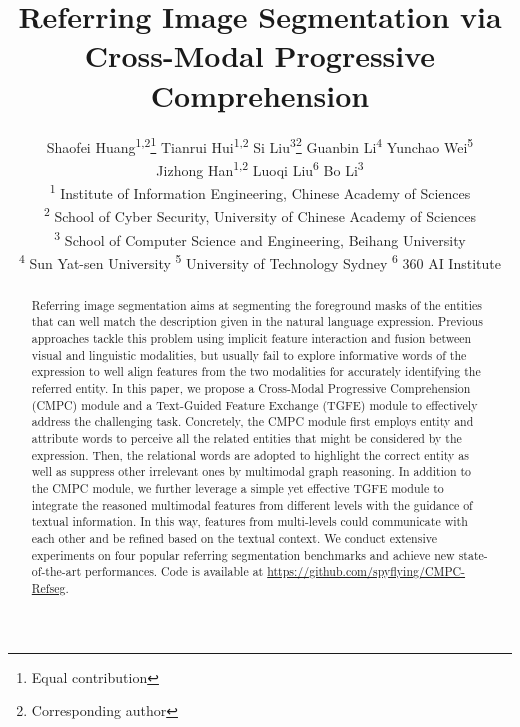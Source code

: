 \documentclass[10pt,twocolumn,letterpaper]{article}
\makeatletter
\newcommand{\printfnsymbol}[1]{\textsuperscript{\@fnsymbol{#1}}}
\makeatother
\begin{document}
\title{Referring Image Segmentation via Cross-Modal Progressive Comprehension}

\author{Shaofei Huang\textsuperscript{\rm 1,2}\thanks{Equal contribution} \quad Tianrui Hui\textsuperscript{\rm 1,2}\printfnsymbol{1} \quad Si Liu\textsuperscript{\rm 3}\thanks{Corresponding author} \quad Guanbin Li\textsuperscript{\rm 4} \quad Yunchao Wei\textsuperscript{\rm 5}\\ \quad Jizhong Han\textsuperscript{\rm 1,2} \quad Luoqi Liu\textsuperscript{\rm 6} \quad Bo Li\textsuperscript{\rm 3}\\
\textsuperscript{\rm 1} Institute of Information Engineering, Chinese Academy of Sciences\\
\textsuperscript{\rm 2} School of Cyber Security, University of Chinese Academy of Sciences\\
\textsuperscript{\rm 3} School of Computer Science and Engineering, Beihang University\\
\textsuperscript{\rm 4} Sun Yat-sen University
\quad\textsuperscript{\rm 5} University of Technology Sydney
\quad\textsuperscript{\rm 6} 360 AI Institute
}

\maketitle
\thispagestyle{empty}
\pagestyle{empty}

\begin{abstract}
   Referring image segmentation aims at segmenting the foreground masks 
   of the entities that can well match the description given in the 
   natural language expression. Previous approaches tackle this problem 
   using implicit feature interaction and fusion between visual and 
   linguistic modalities, but usually fail to explore informative words 
   of the expression to well align features from the two modalities 
   for accurately identifying the referred entity. In this paper, we propose 
   a Cross-Modal Progressive Comprehension (CMPC) module and a Text-Guided 
   Feature Exchange (TGFE) module to effectively address the challenging task. 
   Concretely, the CMPC module first employs entity and attribute words to 
   perceive all the related entities that might be considered by the expression. 
   Then, the relational words are adopted to highlight the correct entity 
   as well as suppress other irrelevant ones by multimodal graph reasoning. 
   In addition to the CMPC module, we further leverage a simple yet effective 
   TGFE module to integrate the reasoned multimodal features from different 
   levels with the guidance of textual information. In this way, 
   features from multi-levels could communicate with each other and be refined 
   based on the textual context. We conduct extensive experiments on four popular 
   referring segmentation benchmarks and achieve new state-of-the-art performances. 
   Code is available at \url{https://github.com/spyflying/CMPC-Refseg}.
\end{abstract}
\end{document}
